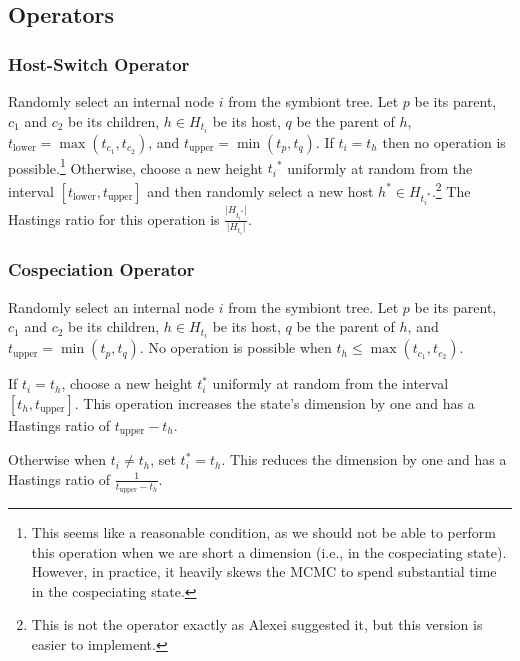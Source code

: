 \documentclass{article}
\begin{document}
        \subsection*{Operators}

            \subsubsection*{Host-Switch Operator}

                Randomly select an internal node $i$ from the symbiont tree.
                Let $p$ be its parent, $c_1$ and $c_2$ be its children, $h \in
                H_{t_i}$ be its host, $q$ be the parent of $h$, $t_\text{lower}
                = \max\left(t_{c_1},t_{c_2}\right)$, and $t_\text{upper} =
                \min\left(t_p,t_q\right)$. If $t_i = t_h$ then no operation is
                possible.\footnote{This seems like a reasonable condition, as
                we should not be able to perform this operation when we are
                short a dimension (i.e., in the cospeciating state). However,
                in practice, it heavily skews the MCMC to spend substantial
                time in the cospeciating state.} Otherwise, choose a new height ${t_i}^*$ uniformly at
                random from the interval $\left[t_\text{lower},
                t_\text{upper}\right]$ and then randomly select a new host $h^*
                \in H_{{t_i}^*}.$\footnote{This is not the operator exactly as
                Alexei suggested it, but this version is easier to implement.}
                The Hastings ratio for this operation is
                $\frac{\lvert{H_{{t_i}^*}}\rvert} {\lvert{H_{t_i}}\rvert}$.

            \subsubsection*{Cospeciation Operator}

                Randomly select an internal node $i$ from the symbiont tree.
                Let $p$ be its parent, $c_1$ and $c_2$ be its children, $h \in
                H_{t_i}$ be its host, $q$ be the parent of $h$, and
                $t_\text{upper} = \min\left(t_p,t_q\right)$. No operation is
                possible when $t_h \leq \max\left(t_{c_1},t_{c_2}\right)$.

                If $t_i = t_h$, choose a new height $t_i^*$ uniformly at random
                from the interval $\left[t_h, t_\text{upper}\right]$. This
                operation increases the state's dimension by one and has a
                Hastings ratio of $t_\text{upper} - t_h$.

                Otherwise when $t_i \neq t_h$, set $t_i^* = t_h$.  This reduces
                the dimension by one and has a Hastings ratio of
                $\frac{1}{t_\text{upper} - t_h}$.
\end{document}
